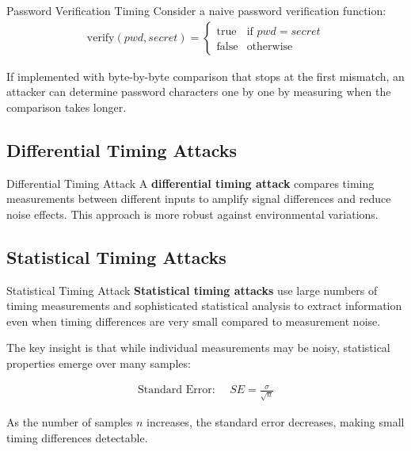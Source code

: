 \documentclass[12pt,a4paper]{article}
\theoremstyle{definition}
\begin{document}
\begin{examplebox}{Password Verification Timing}
Consider a naive password verification function:
\begin{align}
\text{verify}(pwd, secret) = \begin{cases}
\text{true} & \text{if } pwd = secret \\
\text{false} & \text{otherwise}
\end{cases}
\end{align}

If implemented with byte-by-byte comparison that stops at the first mismatch, an attacker can determine password characters one by one by measuring when the comparison takes longer.
\end{examplebox}

\subsection{Differential Timing Attacks}

\begin{definitionbox}{Differential Timing Attack}
A \textbf{differential timing attack} compares timing measurements between different inputs to amplify signal differences and reduce noise effects. This approach is more robust against environmental variations.
\end{definitionbox}

\subsection{Statistical Timing Attacks}

\begin{definitionbox}{Statistical Timing Attack}
\textbf{Statistical timing attacks} use large numbers of timing measurements and sophisticated statistical analysis to extract information even when timing differences are very small compared to measurement noise.
\end{definitionbox}

The key insight is that while individual measurements may be noisy, statistical properties emerge over many samples:

\begin{align}
\text{Standard Error: } \quad SE = \frac{\sigma}{\sqrt{n}}
\end{align}

As the number of samples $n$ increases, the standard error decreases, making small timing differences detectable.
\end{document}
